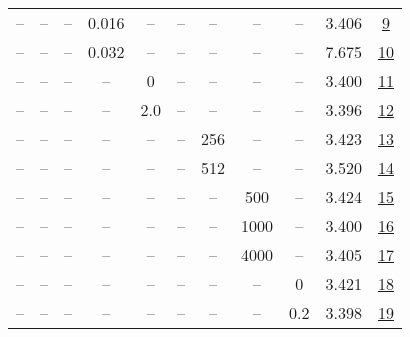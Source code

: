 \begin{table}[H]
\begin{tabular}{ccccccccccc}
-- & -- & -- & 0.016 & -- & -- & -- & -- & -- & 3.406 & \href{https://wandb.ai/stanford-mercury/optimizer-scaling/runs/sweep-130m-5B-nadamwf31525lr0.016-wd0.1-minlr0-warmup2000-b10.95-2feb0f}{9} \\
-- & -- & -- & 0.032 & -- & -- & -- & -- & -- & 7.675 & \href{https://wandb.ai/stanford-mercury/optimizer-scaling/runs/sweep-130m-5B-nadamw651369lr0.032-wd0.1-minlr0-warmup2000-b10.95-fdb2c9}{10} \\
-- & -- & -- & -- & 0 & -- & -- & -- & -- & 3.400 & \href{https://wandb.ai/stanford-mercury/optimizer-scaling/runs/sweep-130m-5B-nadamw0f5ccalr0.008-wd0.1-minlr0-warmup2000-b10.95-030953}{11} \\
-- & -- & -- & -- & 2.0 & -- & -- & -- & -- & 3.396 & \href{https://wandb.ai/stanford-mercury/optimizer-scaling/runs/sweep-130m-5B-nadamw381feelr0.008-wd0.1-minlr0-warmup2000-b10.95-c3653e}{12} \\
-- & -- & -- & -- & -- & -- & 256 & -- & -- & 3.423 & \href{https://wandb.ai/stanford-mercury/optimizer-scaling/runs/sweep-130m-5B-nadamw96aba0lr0.008-wd0.1-minlr0-warmup2000-b10.95-3295ec}{13} \\
-- & -- & -- & -- & -- & -- & 512 & -- & -- & 3.520 & \href{https://wandb.ai/stanford-mercury/optimizer-scaling/runs/sweep-130m-5B-nadamw83e5b9lr0.008-wd0.1-minlr0-warmup2000-b10.95-5e23a1}{14} \\
-- & -- & -- & -- & -- & -- & -- & 500 & -- & 3.424 & \href{https://wandb.ai/stanford-mercury/optimizer-scaling/runs/sweep-130m-5B-nadamw497ea7lr0.008-wd0.1-minlr0-warmup500-b10.95--380798}{15} \\
-- & -- & -- & -- & -- & -- & -- & 1000 & -- & 3.400 & \href{https://wandb.ai/stanford-mercury/optimizer-scaling/runs/sweep-130m-5B-nadamw2fb397lr0.008-wd0.1-minlr0-warmup1000-b10.95-5c87cd}{16} \\
-- & -- & -- & -- & -- & -- & -- & 4000 & -- & 3.405 & \href{https://wandb.ai/stanford-mercury/optimizer-scaling/runs/sweep-130m-5B-nadamw6b0927lr0.008-wd0.1-minlr0-warmup4000-b10.95-fe47d6}{17} \\
-- & -- & -- & -- & -- & -- & -- & -- & 0 & 3.421 & \href{https://wandb.ai/stanford-mercury/optimizer-scaling/runs/sweep-130m-5B-nadamwc96a2flr0.008-wd0-minlr0-warmup2000-b10.95-b-c7af0e}{18} \\
-- & -- & -- & -- & -- & -- & -- & -- & 0.2 & 3.398 & \href{https://wandb.ai/stanford-mercury/optimizer-scaling/runs/sweep-130m-5B-nadamwd739b9lr0.008-wd0.2-minlr0-warmup2000-b10.95-934992}{19} \\
\bottomrule
\end{tabular}
\end{table}

